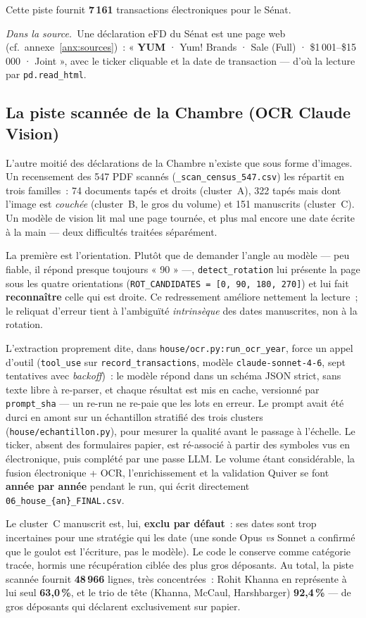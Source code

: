 \documentclass[11pt,a4paper]{article}
\newcommand{\co}[1]{\texttt{\small #1}}
\newcommand{\srcex}[1]{\par\smallskip\noindent{\color{black!55}\rule{2pt}{\baselineskip}}\hspace{6pt}\begin{minipage}{\dimexpr\linewidth-16pt}\small\textit{Dans la source.}\ #1\end{minipage}\par\smallskip}
\begin{document}
Cette piste fournit \textbf{7\,161} transactions électroniques pour le Sénat.

\srcex{Une déclaration eFD du Sénat est une page web (cf.~annexe~\ref{anx:sources})~: « \textbf{YUM} ·
Yum! Brands · Sale (Full) · \$1\,001--\$15\,000 · Joint », avec le ticker cliquable et la date de
transaction — d'où la lecture par \co{pd.read_html}.}

\subsection{La piste scannée de la Chambre (OCR Claude Vision)}
\label{sec:hocr}
L'autre moitié des déclarations de la Chambre n'existe que sous forme d'images. Un recensement des 547 PDF
scannés (\co{_scan_census_547.csv}) les répartit en trois familles~: 74 documents tapés et droits
(cluster~A), 322 tapés mais dont l'image est \emph{couchée} (cluster~B, le gros du volume) et 151 manuscrits
(cluster~C). Un modèle de vision lit mal une page tournée, et plus mal encore une date écrite à la main —
deux difficultés traitées séparément.

La première est l'orientation. Plutôt que de demander l'angle au modèle — peu fiable, il répond presque
toujours « 90 » —, \co{detect_rotation} lui présente la page sous les quatre orientations
(\co{ROT_CANDIDATES = [0, 90, 180, 270]}) et lui fait \textbf{reconnaître} celle qui est droite. Ce
redressement améliore nettement la lecture~; le reliquat d'erreur tient à l'ambiguïté \emph{intrinsèque} des
dates manuscrites, non à la rotation.

L'extraction proprement dite, dans \co{house/ocr.py:run_ocr_year}, force un appel d'outil (\co{tool_use} sur
\co{record_transactions}, modèle \co{claude-sonnet-4-6}, sept tentatives avec \emph{backoff})~: le modèle
répond dans un schéma JSON strict, sans texte libre à re-parser, et chaque résultat est mis en cache,
versionné par \co{prompt_sha} — un re-run ne re-paie que les lots en erreur. Le prompt avait été durci en
amont sur un échantillon stratifié des trois clusters (\co{house/echantillon.py}), pour mesurer la qualité
avant le passage à l'échelle. Le ticker, absent des formulaires papier, est ré-associé à partir des symboles
vus en électronique, puis complété par une passe LLM. Le volume étant considérable, la fusion
électronique + OCR, l'enrichissement et la validation Quiver se font \textbf{année par année} pendant le run,
qui écrit directement \co{06_house_\{an\}_FINAL.csv}.

Le cluster~C manuscrit est, lui, \textbf{exclu par défaut}~: ses dates sont trop incertaines pour une
stratégie qui les date (une sonde Opus \emph{vs} Sonnet a confirmé que le goulot est l'écriture, pas le
modèle). Le code le conserve comme catégorie tracée, hormis une récupération ciblée des plus gros déposants.
Au total, la piste scannée fournit \textbf{48\,966} lignes, très concentrées~: Rohit Khanna en représente à
lui seul \textbf{63,0\,\%}, et le trio de tête (Khanna, McCaul, Harshbarger) \textbf{92,4\,\%} — de gros
déposants qui déclarent exclusivement sur papier.
\end{document}

